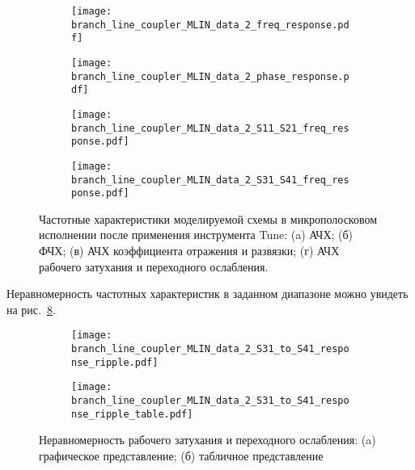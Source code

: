 \begin{figure}[!ht]
    \centering
    \begin{subfigure}[b]{0.45\textwidth}
        \centering
        \texttt{[image: branch\_line\_coupler\_MLIN\_data\_2\_freq\_response.pdf]}
        \caption{}%
    \label{fig:branch_line_coupler_MLIN_data_2_freq_response}
    \end{subfigure}
    \hfill
    \begin{subfigure}[b]{0.45\textwidth}
        \centering
        \texttt{[image: branch\_line\_coupler\_MLIN\_data\_2\_phase\_response.pdf]}
        \caption{}%
    \label{fig:branch_line_coupler_MLIN_data_2_phase_response}
    \end{subfigure}
    \vfill
    \begin{subfigure}[b]{0.45\textwidth}
        \centering
        \texttt{[image: branch\_line\_coupler\_MLIN\_data\_2\_S11\_S21\_freq\_response.pdf]}
        \caption{}%
    \label{fig:branch_line_coupler_MLIN_data_2_S11_S21_freq_response}
    \end{subfigure}
    \hfill
    \begin{subfigure}[b]{0.45\textwidth}
        \centering
        \texttt{[image: branch\_line\_coupler\_MLIN\_data\_2\_S31\_S41\_freq\_response.pdf]}
        \caption{}%
    \label{fig:branch_line_coupler_MLIN_data_2_S31_S41_freq_response}
    \end{subfigure}
    \caption{%
        Частотные характеристики моделируемой схемы в микрополосковом исполнении после применения инструмента Tune:
        (a) АЧХ;
        (б) ФЧХ;
        (в) АЧХ коэффициента отражения и развязки;
        (г) АЧХ рабочего затухания и переходного ослабления.
    }%
    \label{fig:branch_line_coupler_MLIN_data_2}
\end{figure}

Неравномерность частотных характеристик в заданном диапазоне можно увидеть на рис.~\ref{fig:branch_line_coupler_MLIN_data_2_response_ripple}.

\begin{figure}[!ht]
    \centering
    \begin{subfigure}[b]{0.6\textwidth}
        \centering
        \texttt{[image: branch\_line\_coupler\_MLIN\_data\_2\_S31\_to\_S41\_response\_ripple.pdf]}
        \caption{}%
    \label{fig:branch_line_coupler_MLIN_data_2_S31_to_S41_response_ripple}
    \end{subfigure}
    \vfill
    \begin{subfigure}[b]{0.6\textwidth}
        \centering
        \texttt{[image: branch\_line\_coupler\_MLIN\_data\_2\_S31\_to\_S41\_response\_ripple\_table.pdf]}
        \caption{}%
    \label{fig:branch_line_coupler_MLIN_data_2_S31_to_S41_response_ripple_table}
    \end{subfigure}
    \caption{%
        Неравномерность рабочего затухания и переходного ослабления:
        (a) графическое представление;
        (б) табличное представление
    }%
    \label{fig:branch_line_coupler_MLIN_data_2_response_ripple}
\end{figure}

